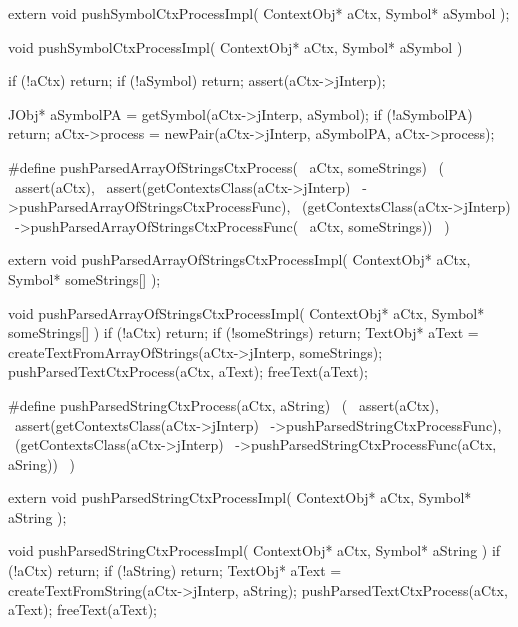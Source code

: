 \startCHeader
extern void pushSymbolCtxProcessImpl(
  ContextObj* aCtx,
  Symbol* aSymbol
);
\stopCHeader
{}

\startCCode
void pushSymbolCtxProcessImpl(
  ContextObj* aCtx,
  Symbol* aSymbol
) {
  if (!aCtx) return;
  if (!aSymbol) return;
  assert(aCtx->jInterp);

  JObj* aSymbolPA =
    getSymbol(aCtx->jInterp, aSymbol);
  if (!aSymbolPA) return;
  aCtx->process = newPair(aCtx->jInterp, aSymbolPA, aCtx->process);
}
\stopCCode

\startCHeader
#define pushParsedArrayOfStringsCtxProcess(      \
  aCtx, someStrings)                             \
  (                                              \
    assert(aCtx),                                \
    assert(getContextsClass(aCtx->jInterp)       \
      ->pushParsedArrayOfStringsCtxProcessFunc), \
    (getContextsClass(aCtx->jInterp)             \
      ->pushParsedArrayOfStringsCtxProcessFunc(  \
        aCtx, someStrings))                      \
  )
\stopCHeader

\setCHeaderStream{private}
\startCHeader
extern void pushParsedArrayOfStringsCtxProcessImpl(
  ContextObj* aCtx,
  Symbol* someStrings[]
);
\stopCHeader
{}

\startCCode
void pushParsedArrayOfStringsCtxProcessImpl(
  ContextObj* aCtx,
  Symbol* someStrings[]
) {
  if (!aCtx) return;
  if (!someStrings) return;
  TextObj* aText =
    createTextFromArrayOfStrings(aCtx->jInterp, someStrings);
  pushParsedTextCtxProcess(aCtx, aText);
  freeText(aText);
}
\stopCCode

\startCHeader
#define pushParsedStringCtxProcess(aCtx, aString)      \
  (                                                    \
    assert(aCtx),                                      \
    assert(getContextsClass(aCtx->jInterp)             \
      ->pushParsedStringCtxProcessFunc),               \
    (getContextsClass(aCtx->jInterp)                   \
      ->pushParsedStringCtxProcessFunc(aCtx, aSring))  \
  )
\stopCHeader

\setCHeaderStream{private}
\startCHeader
extern void pushParsedStringCtxProcessImpl(
  ContextObj* aCtx,
  Symbol* aString
);
\stopCHeader
\setCHeaderStream{public}

\startCCode
void pushParsedStringCtxProcessImpl(
  ContextObj* aCtx,
  Symbol* aString
) {
  if (!aCtx) return;
  if (!aString) return;
  TextObj* aText =
    createTextFromString(aCtx->jInterp, aString);
  pushParsedTextCtxProcess(aCtx, aText);
  freeText(aText);
}
\stopCCode

